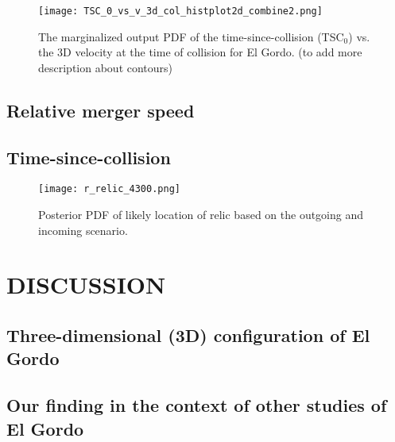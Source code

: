 \documentclass[letterpaper,useAMS,usenatbib]{"mn2e"}
\begin{document}
\begin{figure}
	\texttt{[image: TSC\_0\_vs\_v\_3d\_col\_histplot2d\_combine2.png]}
	\caption{The marginalized output PDF of the time-since-collision
(TSC$_0$) vs. the 3D velocity at the time of collision for El Gordo. (to
add more description about contours) }
	\label{fig:TSC_v3D}
\end{figure}

\subsection{Relative merger speed}


\subsection{Time-since-collision}  


\begin{figure} 
	\texttt{[image: r\_relic\_4300.png]}
	\caption{Posterior PDF of likely location of relic based on the
    outgoing and incoming scenario.}
\end{figure}


\section{DISCUSSION}

\subsection{Three-dimensional (3D) configuration of El Gordo}


\subsection{Our finding in the context of other studies of El Gordo}

\end{document}
